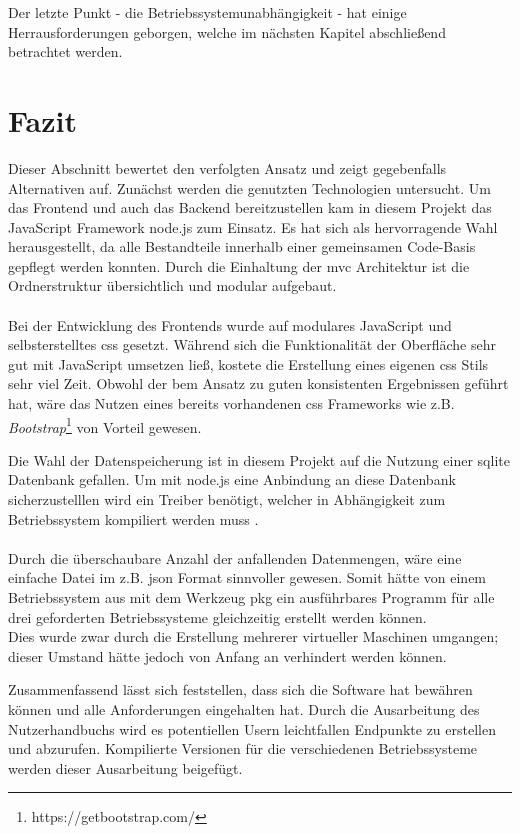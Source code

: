 Der letzte Punkt - die Betriebssystemunabhängigkeit - hat einige Herrausforderungen geborgen, welche im nächsten Kapitel abschließend betrachtet werden.

\section{Fazit} \label{sec:evaluation}

Dieser Abschnitt bewertet den verfolgten Ansatz und zeigt gegebenfalls Alternativen auf.
Zunächst werden die genutzten Technologien untersucht. Um das Frontend und auch das Backend bereitzustellen kam in diesem Projekt das JavaScript Framework node.js zum Einsatz. Es hat sich als hervorragende Wahl herausgestellt, da alle Bestandteile innerhalb einer gemeinsamen Code-Basis gepflegt werden konnten. Durch die Einhaltung der \gls{mvc} Architektur ist die Ordnerstruktur übersichtlich und modular aufgebaut. \\
\\
Bei der Entwicklung des Frontends wurde auf modulares JavaScript und selbsterstelltes \gls{css} gesetzt. Während sich die Funktionalität der Oberfläche sehr gut mit JavaScript umsetzen ließ, kostete die Erstellung eines eigenen \gls{css} Stils sehr viel Zeit. Obwohl der \gls{bem} Ansatz zu guten konsistenten Ergebnissen geführt hat, wäre das Nutzen eines bereits vorhandenen \gls{css} Frameworks wie z.B. \textit{Bootstrap}\footnote{https://getbootstrap.com/} von Vorteil gewesen.

Die Wahl der Datenspeicherung ist in diesem Projekt auf die Nutzung einer sqlite Datenbank gefallen. Um mit node.js eine Anbindung an diese Datenbank sicherzustelllen wird ein Treiber benötigt, welcher in Abhängigkeit zum Betriebssystem kompiliert werden muss \cite{Joschua.20201219}. 
\\ \\
Durch die überschaubare Anzahl der anfallenden Datenmengen, wäre eine einfache Datei im z.B. \gls{json} Format sinnvoller gewesen. Somit hätte von einem Betriebssystem aus mit dem Werkzeug pkg ein ausführbares Programm für alle drei geforderten Betriebssysteme gleichzeitig erstellt werden können. 
\\ Dies wurde zwar durch die Erstellung mehrerer virtueller Maschinen umgangen; dieser Umstand hätte jedoch von Anfang an verhindert werden können. 

Zusammenfassend lässt sich feststellen, dass sich die Software hat bewähren können und alle Anforderungen eingehalten hat. Durch die Ausarbeitung des Nutzerhandbuchs wird es potentiellen Usern leichtfallen Endpunkte zu erstellen und abzurufen. Kompilierte Versionen für die verschiedenen Betriebssysteme werden dieser Ausarbeitung beigefügt.

